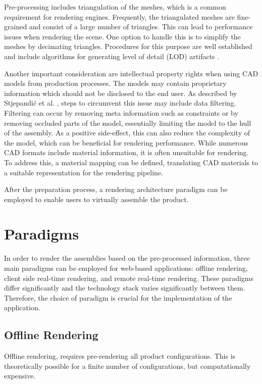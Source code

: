 Pre-processing includes triangulation of the meshes, which is a common requirement for rendering engines. Frequently, the triangulated meshes are fine-grained and consist of a large number of triangles. This can lead to performance issues when rendering the scene. One option to handle this is to simplify the meshes by decimating triangles. Procedures for this purpose are well established and include algorithms for generating level of detail (\gls{LOD}) artifacts \cite{luebke2003level}.

Another important consideration are intellectual property rights when using \gls{CAD} models from production processes. The models may contain proprietary information which should not be disclosed to the end user. As described by Stjepandić et al. \cite{ipr}, steps to circumvent this issue may include data filtering. Filtering can occur by removing meta information such as constraints or by removing occluded parts of the model, essentially limiting the model to the hull of the assembly. As a positive side-effect, this can also reduce the complexity of the model, which can be beneficial for rendering performance.
While numerous \gls{CAD} formats include material information, it is often unsuitable for rendering. To address this, a material mapping can be defined, translating \gls{CAD} materials to a suitable representation for the rendering pipeline.

After the preparation process, a rendering architecture paradigm can be employed to enable users to virtually assemble the product.

\section{Paradigms}

In order to render the assemblies based on the pre-processed information, three main paradigms can be employed for web-based applications: offline rendering, client side real-time rendering, and remote real-time rendering. These paradigms differ significantly and the technology stack varies significantly between them. Therefore, the choice of paradigm is crucial for the implementation of the application.

\subsection*{Offline Rendering}

Offline rendering, requires pre-rendering all product configurations. This is theoretically possible for a finite number of configurations, but computationally expensive. 

